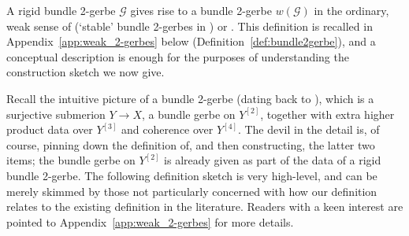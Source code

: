 \documentclass[12pt]{amsart}
\theoremstyle{plain}
\theoremstyle{definition}
\theoremstyle{remark}
\numberwithin{equation}{section}
\newcommand{\cG}{\mathcal{G}}
\newcommand{\<}{\langle}
\renewcommand{\>}{\rangle}
\begin{document}
A rigid bundle 2-gerbe $\cG$ gives rise to a bundle 2-gerbe $w(\cG)$ in the ordinary, weak sense of \cite{Ste} (`stable' bundle 2-gerbes in \cite[Definition 7.4]{StevPhD}) or \cite{Wal}. 
This definition is recalled in Appendix~\ref{app:weak_2-gerbes} below (Definition~\ref{def:bundle2gerbe}), and a conceptual description is enough for the purposes of understanding the construction sketch we now give.

Recall the intuitive picture of a bundle 2-gerbe (dating back to \cite{Carey-Murray-Wang_97}), which is a surjective submerion $Y\to X$, a bundle gerbe on $Y^{[2]}$, together with extra higher product data over $Y^{[3]}$ and coherence over $Y^{[4]}$. 
The devil in the detail is, of course, pinning down the definition of, and then constructing, the latter two items; the bundle gerbe on $Y^{[2]}$ is already given as part of the data of a rigid bundle 2-gerbe. 
The following definition sketch is very high-level, and can be merely skimmed by those not particularly concerned with how our definition relates to the existing definition in the literature. 
Readers with a keen interest are pointed to Appendix~\ref{app:weak_2-gerbes} for more details.
\end{document}
